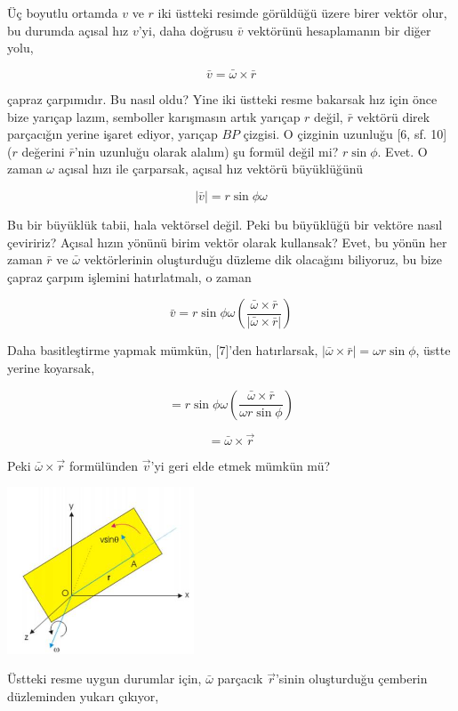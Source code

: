 \documentclass[12pt,fleqn]{article}\usepackage{../../common}
\begin{document}
Üç boyutlu ortamda $v$ ve $r$ iki üstteki resimde görüldüğü üzere birer vektör
olur, bu durumda açısal hız $v$'yi, daha doğrusu $\bar{v}$ vektörünü
hesaplamanın bir diğer yolu,

$$
\bar{v} = \bar{\omega} \times \bar{r}
$$

çapraz çarpımıdır. Bu nasıl oldu? Yine iki üstteki resme bakarsak hız için önce
bize yarıçap lazım, semboller karışmasın artık yarıçap $r$ değil, $\bar{r}$
vektörü direk parçacığın yerine işaret ediyor, yarıçap $BP$ çizgisi. O çizginin
uzunluğu [6, sf. 10] ($r$ değerini $\bar{r}$'nin uzunluğu olarak alalım) şu
formül değil mi? $r\sin\phi$. Evet. O zaman $\omega$ açısal hızı ile çarparsak,
açısal hız vektörü büyüklüğünü

$$
|\bar{v}| = r \sin\phi \omega
$$

Bu bir büyüklük tabii, hala vektörsel değil. Peki bu büyüklüğü bir vektöre nasıl
çeviririz?  Açısal hızın yönünü birim vektör olarak kullansak?  Evet, bu yönün
her zaman $\bar{r}$ ve $\bar{\omega}$ vektörlerinin oluşturduğu düzleme dik
olacağını biliyoruz, bu bize çapraz çarpım işlemini hatırlatmalı, o zaman

$$
\bar{v} = r \sin\phi \omega
\left( \frac{\bar{\omega} \times \bar{r}}{| \bar{\omega} \times \bar{r} |}  \right)
$$

Daha basitleştirme yapmak mümkün, [7]'den hatırlarsak,
$|\bar{\omega} \times \bar{r} | = \omega r \sin\phi$, üstte yerine koyarsak,

$$
 = r \sin\phi \omega
\left( \frac{\bar{\omega} \times \bar{r}}{\omega r \sin\phi}  \right)
$$

$$
 = \bar{\omega} \times \vec{r}
$$

Peki $\bar{\omega} \times \vec{r}$ formülünden $\vec{v}$'yi geri elde etmek mümkün mü?

\includegraphics[width=15em]{phy_005_basics_02_16.jpg}

Üstteki resme uygun durumlar için, $\bar{\omega}$ parçacık $\vec{r}$'sinin
oluşturduğu çemberin düzleminden yukarı çıkıyor,
\end{document}
